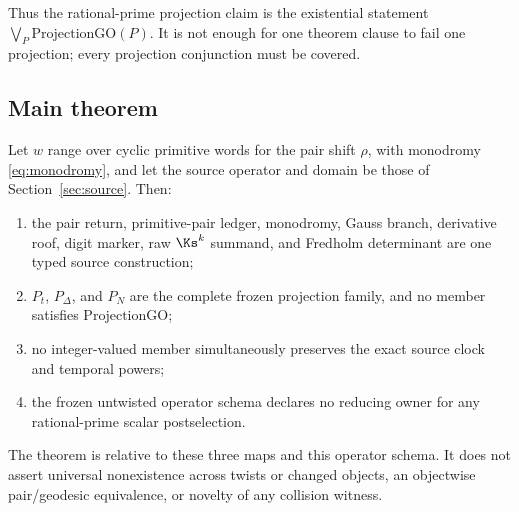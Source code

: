 Thus the rational-prime projection claim is the existential statement
$\bigvee_P\mathrm{ProjectionGO}(P)$.  It is not enough for one theorem clause
to fail one projection; every projection conjunction must be covered.

\subsection{Main theorem}

\begin{theorem}
\label{thm:main}
Let $w$ range over cyclic primitive words for the pair shift $\rho$, with monodromy
\eqref{eq:monodromy}, and let the source operator and domain be those of
Section~\ref{sec:source}.  Then:

\begin{enumerate}
  \item the pair return, primitive-pair ledger, monodromy, Gauss branch,
  derivative roof, digit marker, raw $\Ks^k$ summand, and Fredholm determinant
  are one typed source construction;
  \item $P_t$, $P_\Delta$, and $P_N$ are the complete frozen projection
  family, and no member satisfies $\mathrm{ProjectionGO}$;
  \item no integer-valued member simultaneously preserves the exact source
  clock and temporal powers;
  \item the frozen untwisted operator schema declares no reducing owner for
  any rational-prime scalar postselection.
\end{enumerate}

The theorem is relative to these three maps and this operator schema.  It
does not assert universal nonexistence across twists or changed objects, an
objectwise pair/geodesic equivalence, or novelty of any collision witness.
\end{theorem}

